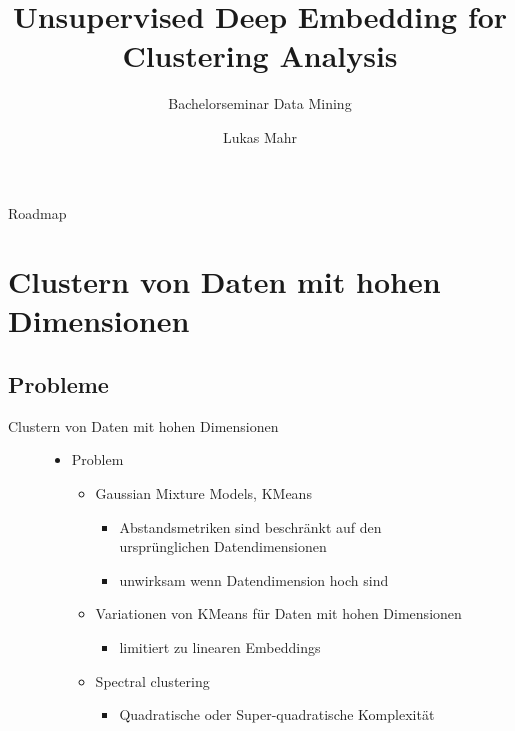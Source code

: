 \documentclass{beamer}
\title{Unsupervised Deep Embedding for Clustering Analysis}
\subtitle{Bachelorseminar Data Mining}
\author{Lukas Mahr}
\institute{Ludwig-Maximilians-Universität München}
\date{}
\begin{document}
\begin{frame}
\titlepage
\end{frame}


\begin{frame}[plain]{Roadmap}
\tableofcontents[hideallsubsections]
\end{frame}

\section{Clustern von Daten mit hohen Dimensionen}
\subsection{Probleme}
\begin{frame}[t]{Clustern von Daten mit hohen Dimensionen}\vspace{40pt}
\begin{figure}
\center
\LARGE
\begin{itemize}
\item Problem
\begin{itemize}
\item Gaussian Mixture Models, KMeans
\begin{itemize}
\item Abstandsmetriken sind beschränkt auf den ursprünglichen Datendimensionen
\item unwirksam wenn Datendimension hoch sind\cite{steinbach}
\end{itemize}
\item Variationen von KMeans für Daten mit hohen Dimensionen
\begin{itemize}
\item limitiert zu linearen Embeddings\cite{ye}
\end{itemize}
\item Spectral clustering
\begin{itemize}
\item Quadratische oder Super-quadratische Komplexität
\end{itemize}
\end{itemize}
\end{itemize}
\end{figure}

\end{frame}
\end{document}

